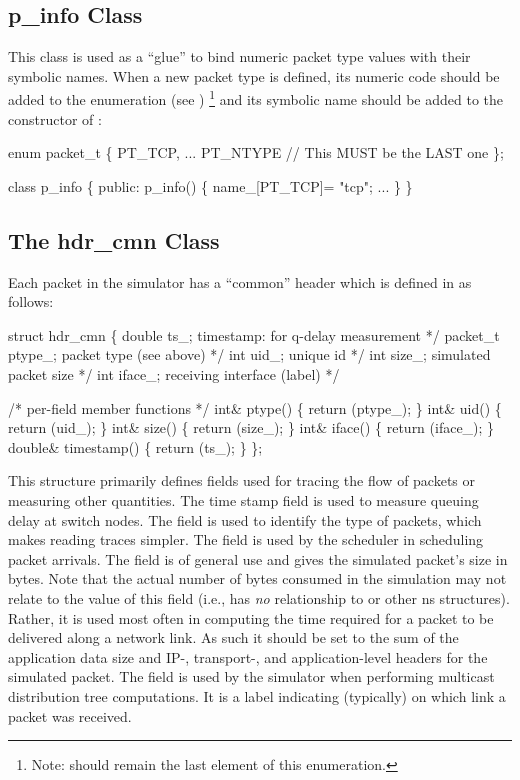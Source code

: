 \subsection{p\_info Class}
\label{sec:pinfoclass}

This class is used as a ``glue'' to bind numeric packet type values
with their symbolic names.  When a new packet type is defined, its
numeric code should be added to the enumeration  (see
) \footnote{Note:  should remain the last element of this
enumeration.} and its symbolic name should be added to the constructor
of :
\begin{program}
enum packet_t \{
	PT_TCP,
	...
	PT_NTYPE // This MUST be the LAST one
\};

class p_info \{
public:
	p_info() \{
		name_[PT_TCP]= "tcp";
		...
        \}
\}
\end{program}
\subsection{The hdr\_cmn Class}
\label{sec:commonhdr}

Each packet in the simulator has a ``common''
header which is defined in  as follows:
\begin{program}
        struct hdr_cmn \{
                double    ts_;            \* timestamp: for q-delay measurement */
                packet_t  ptype_;         \* packet type (see above) */
                int       uid_;           \* unique id */
                int       size_;          \* simulated packet size */
                int       iface_;         \* receiving interface (label) */
         
                /* {\cf per-field member functions} */
                int& ptype() \{ return (ptype_); \}
                int& uid() \{ return (uid_); \}
                int& size() \{ return (size_); \}
                int& iface() \{ return (iface_); \}
                double& timestamp() \{ return (ts_); \}
        \};
\end{program}
This structure primarily defines fields used for tracing
the flow of packets or measuring other quantities.
The time stamp field is used to measure queuing delay
at switch nodes.
The  field is used to identify the
type of packets, which makes reading traces simpler.
The  field is used by the scheduler in scheduling
packet arrivals.
The  field is of general use and gives the
simulated packet's size in bytes.
Note that the actual number of bytes consumed in the simulation
may not relate to the value of this field
  (i.e.,  has \emph{no} relationship
  to  or other ns structures).
Rather, it is used most often in computing the time required for a packet
to be delivered along a network link.
As such it should be set to the sum of the
  application data size
  and IP-, transport-, and application-level headers
  for the simulated packet.
The  field is used by the simulator when performing
multicast distribution tree computations.
It is a label indicating (typically) on which link a packet was received.

